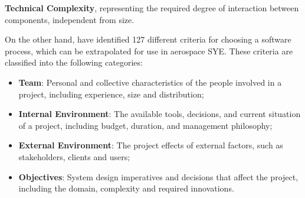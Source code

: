 \documentclass[a4paper,nobib,justified,final]{tufte-book}
\begin{document}
\begin{definition}%
	\textbf{Technical Complexity}, representing the required degree of interaction between components, independent from size.\label{def:complexity}%
\end{definition}

On the other hand, \citeauthor{kalusCriteriaSoftwareProcess2013} \autocite{kalusCriteriaSoftwareProcess2013} have identified 127 different criteria for choosing a software process, which can be extrapolated for use in aerospace \acs{SYE}. These criteria are classified into the following categories:
\begin{itemize}
	\item \textbf{Team}: Personal and collective characteristics of the people involved in a project, including experience, size and distribution;
	\item \textbf{Internal Environment}: The available tools, decisions, and current situation of a project, including budget, duration, and management philosophy;
	\item \textbf{External Environment}: The project effects of external factors, such as stakeholders, clients and users;
	\item \textbf{Objectives}: System design imperatives and decisions that affect the project, including the domain, complexity and required innovations.
\end{itemize}
\end{document}

